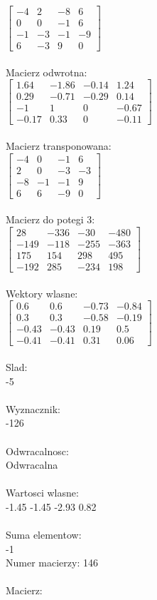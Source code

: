 \documentclass[a4paper,12pt]{article}
\begin{document}
$\begin{bmatrix} -4&2&-8&6\\0&0&-1&6\\-1&-3&-1&-9\\6&-3&9&0 \end{bmatrix}$
\\
\\
Macierz odwrotna:\\

$\begin{bmatrix} 1.64&-1.86&-0.14&1.24\\0.29&-0.71&-0.29&0.14\\-1&1&0&-0.67\\-0.17&0.33&0&-0.11 \end{bmatrix}$
\\
\\
Macierz transponowana:\\

$\begin{bmatrix} -4&0&-1&6\\2&0&-3&-3\\-8&-1&-1&9\\6&6&-9&0 \end{bmatrix}$
\\
\\
Macierz do potegi 3:\\

$\begin{bmatrix} 28&-336&-30&-480\\-149&-118&-255&-363\\175&154&298&495\\-192&285&-234&198 \end{bmatrix}$
\\
\\
Wektory wlasne:\\

$\begin{bmatrix} 0.6&0.6&-0.73&-0.84\\0.3&0.3&-0.58&-0.19\\-0.43&-0.43&0.19&0.5\\-0.41&-0.41&0.31&0.06 \end{bmatrix}$
\\
\\
Slad:\\
-5
\\
\\
Wyznacznik:\\
-126
\\
\\
Odwracalnosc:\\
Odwracalna
\\
\\
Wartosci wlasne:\\
-1.45 -1.45 -2.93 0.82
\\
\\
Suma elementow:\\
-1
\\
\newpage
Numer macierzy:
146
\\
\\
Macierz:\\
\end{document}
